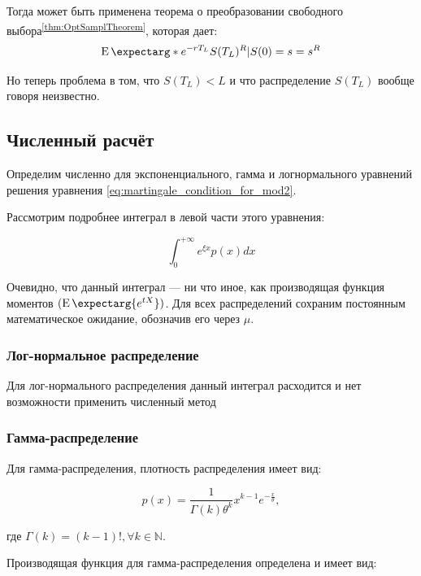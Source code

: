 \documentclass[a4paper,12pt]{article}
\theoremstyle{definition}
\newcommand{\expect}{\operatorname{E}\expectarg}
\begin{document}
Тогда может быть применена теорема о преобразовании свободного выбора\textsuperscript{\ref{thm:OptSamplTheorem}}, которая дает:
\begin{equation}\label{eq:opt_sampl_applied_to_model2}
    \expect*{e^{-rT_L} S(T_L)^{R} | S(0) = s} = s^{R}
\end{equation}

Но теперь проблема в том, что $S(T_L) < L$ и что
распределение $S(T_L)$ вообще говоря неизвестно.

\subsection{Численный расчёт}

Определим численно для экспоненциального, гамма и логнормального уравнений решения уравнения \eqref{eq:martingale_condition_for_mod2}.

Рассмотрим подробнее интеграл в левой части этого уравнения:

\begin{equation*}
    \int_{0}^{+\infty} e^{\xi x} p(x) dx
\end{equation*}

Очевидно, что данный интеграл --- ни что иное, как производящая функция моментов $(\expect{e^{t X}})$. Для всех распределений сохраним постоянным математическое ожидание, обозначив его через $\mu$.

\subsubsection{Лог-нормальное распределение}

Для лог-нормального распределения данный интеграл расходится и нет возможности применить численный метод

\subsubsection{Гамма-распределение}

Для гамма-распределения, плотность распределения имеет вид:

\begin{equation}
    p(x) = \frac{1}{\Gamma(k) \theta^k} x^{k - 1} e^{-\frac{x}{\theta}},
\end{equation}

где $\Gamma (k) = (k - 1)!, \forall k \in \mathbb{N}$.

Производящая функция для гамма-распределения определена и имеет вид:
\end{document}
